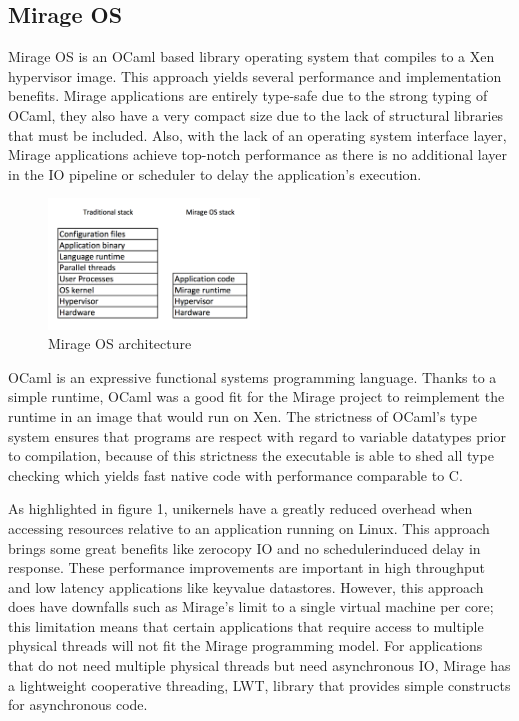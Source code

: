 \documentclass[english,10pt,twocolumn]{article}
\begin{document}
\subsection{Mirage OS}

Mirage OS is an OCaml based library operating system that compiles to a Xen hypervisor image.
This approach yields several performance and implementation benefits.
Mirage applications are entirely type-safe due to the strong typing of OCaml, they also have a very compact size due to the lack of structural libraries that must be included.
Also, with the lack of an operating system interface layer, Mirage applications achieve top-notch performance as there is no additional layer in the IO pipeline or scheduler to delay the application's execution.

\begin{figure}[ht]
  \centering
  \caption{Mirage OS architecture}
  \includegraphics[width=0.5\textwidth]{images/design}
\end{figure}

OCaml is an expressive functional systems programming language.
Thanks to a simple runtime, OCaml was a good fit for the Mirage project to reimplement the runtime in an image that would run on Xen.
The strictness of OCaml's type system ensures that programs are respect with regard to variable datatypes prior to compilation, because of this strictness the executable is able to shed all type checking which yields fast native code with performance comparable to C.

As highlighted in figure 1, unikernels have a greatly reduced overhead when accessing resources relative to an application running on Linux.
This approach brings some great benefits like zero\-copy IO and no scheduler\-induced delay in response.
These performance improvements are important in high throughput and low latency applications like key\-value datastores.
However, this approach does have downfalls such as Mirage's limit to a single virtual machine per core; this limitation means that certain applications that require access to multiple physical threads will not fit the Mirage programming model.
For applications that do not need multiple physical threads but need asynchronous IO, Mirage has a lightweight cooperative threading, LWT, library that provides simple constructs for asynchronous code.
\end{document}
